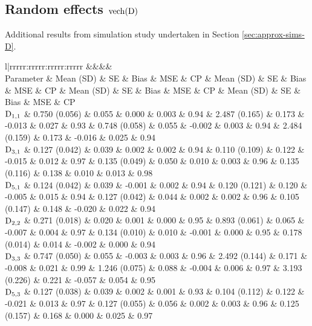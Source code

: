 \thispagestyle{empty}
\begin{landscape}
\subsection{Random effects \texorpdfstring{$\text{vech}\!\left(\mathrm{D}\right)$}{vechD}}\label{sec:appendix-MVJMresults-D}
Additional results from simulation study undertaken in Section \ref{sec:approx-sims-D}.
\begin{table}[ht]
\centering
{}
\captionsetup{font=scriptsize}
\begingroup\tiny
\begin{tabular}{l|rrrrr:rrrrr:rrrrr:rrrrr}
  &&&&\\ 
  Parameter & Mean (SD) & SE & Bias & MSE & CP & Mean (SD) & SE & Bias & MSE & CP & Mean (SD) & SE & Bias & MSE & CP & Mean (SD) & SE & Bias & MSE & CP \\ 
  \hline
  $\mathrm{D}_{1,1}$ &  0.750 (0.056) & 0.055 &  0.000 & 0.003 & 0.94 &  2.487 (0.165) & 0.173 & -0.013 & 0.027 & 0.93 &  0.748 (0.058) & 0.055 & -0.002 & 0.003 & 0.94 &  2.484 (0.159) & 0.173 & -0.016 & 0.025 & 0.94 \\ 
  $\mathrm{D}_{3,1}$ &  0.127 (0.042) & 0.039 &  0.002 & 0.002 & 0.94 &  0.110 (0.109) & 0.122 & -0.015 & 0.012 & 0.97 &  0.135 (0.049) & 0.050 &  0.010 & 0.003 & 0.96 &  0.135 (0.116) & 0.138 &  0.010 & 0.013 & 0.98 \\ 
  $\mathrm{D}_{5,1}$ &  0.124 (0.042) & 0.039 & -0.001 & 0.002 & 0.94 &  0.120 (0.121) & 0.120 & -0.005 & 0.015 & 0.94 &  0.127 (0.042) & 0.044 &  0.002 & 0.002 & 0.96 &  0.105 (0.147) & 0.148 & -0.020 & 0.022 & 0.94 \\ 
  $\mathrm{D}_{2,2}$ &  0.271 (0.018) & 0.020 &  0.001 & 0.000 & 0.95 &  0.893 (0.061) & 0.065 & -0.007 & 0.004 & 0.97 &  0.134 (0.010) & 0.010 & -0.001 & 0.000 & 0.95 &  0.178 (0.014) & 0.014 & -0.002 & 0.000 & 0.94 \\ 
  $\mathrm{D}_{3,3}$ &  0.747 (0.050) & 0.055 & -0.003 & 0.003 & 0.96 &  2.492 (0.144) & 0.171 & -0.008 & 0.021 & 0.99 &  1.246 (0.075) & 0.088 & -0.004 & 0.006 & 0.97 &  3.193 (0.226) & 0.221 & -0.057 & 0.054 & 0.95 \\ 
  $\mathrm{D}_{5,3}$ &  0.127 (0.038) & 0.039 &  0.002 & 0.001 & 0.93 &  0.104 (0.112) & 0.122 & -0.021 & 0.013 & 0.97 &  0.127 (0.055) & 0.056 &  0.002 & 0.003 & 0.96 &  0.125 (0.157) & 0.168 &  0.000 & 0.025 & 0.97 \\ 

\end{tabular}
\end{table}
\end{landscape}
